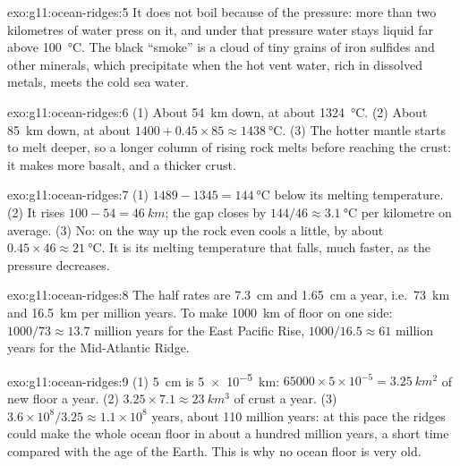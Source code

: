 \begin{solution}{exo:g11:ocean-ridges:5}
It does not boil because of the pressure: more than two kilometres of water
press on it, and under that pressure water stays liquid far above
\qty{100}{\celsius}. The black ``smoke'' is a cloud of tiny grains of iron
sulfides and other minerals, which precipitate when the hot vent water, rich
in dissolved metals, meets the cold sea water.
\end{solution}

\begin{solution}{exo:g11:ocean-ridges:6}
(1) About \qty{54}{km} down, at about \qty{1324}{\celsius}. (2) About
\qty{85}{km} down, at about $1400 + 0.45 \times 85 \approx
\qty{1438}{\celsius}$. (3) The hotter mantle starts to melt deeper, so a
longer column of rising rock melts before reaching the crust: it makes more
basalt, and a thicker crust.
\end{solution}

\begin{solution}{exo:g11:ocean-ridges:7}
(1) $1489 - 1345 = \qty{144}{\celsius}$ below its melting temperature.
(2) It rises $100 - 54 = \qty{46}{km}$; the gap closes by
$144/46 \approx \qty{3.1}{\celsius}$ per kilometre on average. (3) No: on the
way up the rock even cools a little, by about $0.45 \times 46 \approx
\qty{21}{\celsius}$. It is its melting temperature that falls, much faster,
as the pressure decreases.
\end{solution}

\begin{solution}{exo:g11:ocean-ridges:8}
The half rates are \qty{7.3}{cm} and \qty{1.65}{cm} a year, i.e.\
\qty{73}{km} and \qty{16.5}{km} per million years. To make \qty{1000}{km} of
floor on one side: $1000/73 \approx 13.7$ million years for the East Pacific
Rise, $1000/16.5 \approx 61$ million years for the Mid-Atlantic Ridge.
\end{solution}

\begin{solution}{exo:g11:ocean-ridges:9}
(1) \qty{5}{cm} is \qty{5e-5}{km}: $65000 \times 5 \times 10^{-5} =
\qty{3.25}{km^2}$ of new floor a year. (2) $3.25 \times 7.1 \approx
\qty{23}{km^3}$ of crust a year. (3) $3.6 \times 10^8 / 3.25 \approx 1.1
\times 10^8$ years, about 110 million years: at this pace the ridges could
make the whole ocean floor in about a hundred million years, a short time
compared with the age of the Earth. This is why no ocean floor is very old.
\end{solution}

